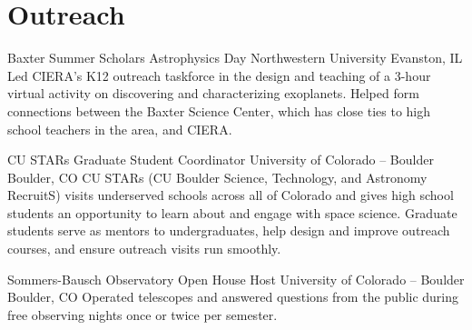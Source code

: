 \section{Outreach}

		{Baxter Summer Scholars Astrophysics Day}
		{}
		{Northwestern University}
		{Evanston, IL}
		{Led CIERA's K12 outreach taskforce in the design and teaching of a 3-hour virtual activity on discovering and characterizing exoplanets.
         Helped form connections between the Baxter Science Center, which has close ties to high school teachers in the area, and CIERA.}

		{CU STARs}
		{Graduate Student Coordinator}
		{University of Colorado -- Boulder}
		{Boulder, CO}
		{
		CU STARs (CU Boulder Science, Technology, and Astronomy RecruitS) visits underserved schools across all of Colorado and gives high school students an opportunity to learn about and engage with space science.
		Graduate students serve as mentors to undergraduates, help design and improve outreach courses, and ensure outreach visits run smoothly.
    	}

    {Sommers-Bausch Observatory Open House Host}
    {}
    {University of Colorado -- Boulder}    
	{Boulder, CO}
    {Operated telescopes and answered questions from the public during free observing nights once or twice per semester.    }

